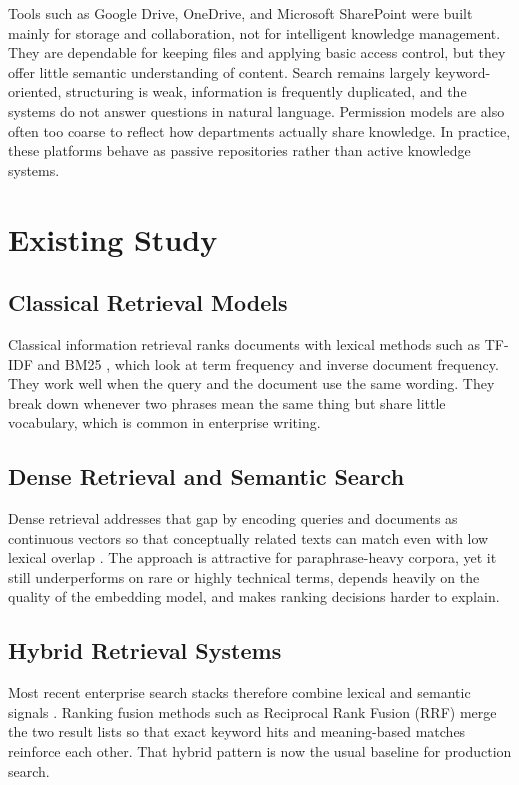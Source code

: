 Tools such as Google Drive, OneDrive, and Microsoft SharePoint were built mainly
for storage and collaboration, not for intelligent knowledge management. They are
dependable for keeping files and applying basic access control, but they offer
little semantic understanding of content. Search remains largely keyword-oriented,
structuring is weak, information is frequently duplicated, and the systems do
not answer questions in natural language. Permission models are also often too
coarse to reflect how departments actually share knowledge. In practice, these
platforms behave as passive repositories rather than active knowledge systems.

\section{Existing Study}

\subsection{Classical Retrieval Models}

Classical information retrieval ranks documents with lexical methods such as
TF-IDF and BM25 \cite{robertson2009bm25}, which look at term frequency and
inverse document frequency. They work well when the query and the document use
the same wording. They break down whenever two phrases mean the same thing but
share little vocabulary, which is common in enterprise writing.

\subsection{Dense Retrieval and Semantic Search}

Dense retrieval addresses that gap by encoding queries and documents as continuous
vectors so that conceptually related texts can match even with low lexical
overlap \cite{karpukhin2020dpr, reimers2019sentence}. The approach is attractive
for paraphrase-heavy corpora, yet it still underperforms on rare or highly
technical terms, depends heavily on the quality of the embedding model, and makes
ranking decisions harder to explain.

\subsection{Hybrid Retrieval Systems}

Most recent enterprise search stacks therefore combine lexical and semantic
signals \cite{ram2023hybrid, lin2021unicoil}. Ranking fusion methods such as
Reciprocal Rank Fusion (RRF) merge the two result lists so that exact keyword hits
and meaning-based matches reinforce each other. That hybrid pattern is now the
usual baseline for production search.

